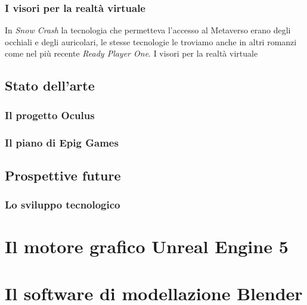         \subsubsection{I visori per la realtà virtuale} %

        In \textit{Snow Crash} la tecnologia che permetteva l'accesso al Metaverso erano degli occhiali e degli auricolari, le stesse tecnologie le troviamo anche in altri romanzi come nel più recente \textit{Ready Player One}.
        I visori per la realtà virtuale

    \subsection{Stato dell'arte}

        \subsubsection{Il progetto Oculus}

        \subsubsection{Il piano di Epig Games}

    \subsection{Prospettive future}

        \subsubsection{Lo sviluppo tecnologico}

\section{Il motore grafico Unreal Engine 5}

\section{Il software di modellazione Blender}











